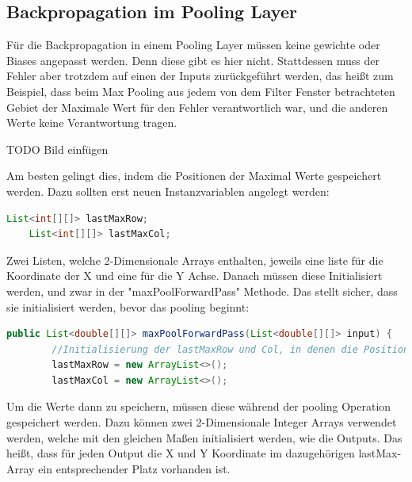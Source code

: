 \documentclass[12pt]{article}
\begin{document}
\subsection{Backpropagation im Pooling Layer}
Für die Backpropagation in einem Pooling Layer müssen keine gewichte oder Biases angepasst werden. Denn diese gibt es hier nicht. Stattdessen muss der Fehler aber trotzdem auf einen der Inputs zurückgeführt werden, das heißt zum Beispiel, dass beim Max Pooling aus jedem von dem Filter Fenster betrachteten Gebiet der Maximale Wert für den Fehler verantwortlich war, und die anderen Werte keine Verantwortung tragen. 

TODO Bild einfügen

Am besten gelingt dies, indem die Positionen der Maximal Werte gespeichert werden.
Dazu sollten erst neuen Instanzvariablen angelegt werden:


\begin{lstlisting}[language=Java]
    List<int[][]> lastMaxRow;
    List<int[][]> lastMaxCol; 
\end{lstlisting}

Zwei Listen, welche 2-Dimensionale Arrays enthalten, jeweils eine liste für die Koordinate der X und eine für die Y Achse.
Danach müssen diese Initialisiert werden, und zwar in der "maxPoolForwardPass" Methode. Das stellt sicher, dass sie initialisiert werden, bevor das pooling beginnt:

\begin{lstlisting}[language=Java]
    public List<double[][]> maxPoolForwardPass(List<double[][]> input) {
        //Initialisierung der lastMaxRow und Col, in denen die Position der Maximalen Werte gespeichert werden
        lastMaxRow = new ArrayList<>();
        lastMaxCol = new ArrayList<>();
\end{lstlisting}

Um die Werte dann zu speichern, müssen diese während der pooling Operation gespeichert werden.
Dazu können zwei 2-Dimensionale Integer Arrays verwendet werden, welche mit den gleichen Maßen initialisiert werden, wie die Outputs. Das heißt, dass für jeden Output die X und Y Koordinate im dazugehörigen lastMax-Array ein entsprechender Platz vorhanden ist.
\end{document}
